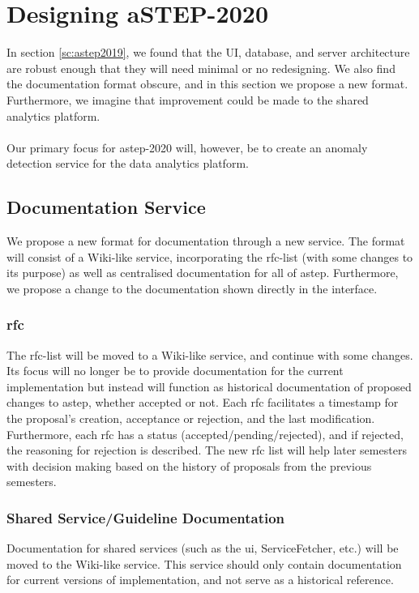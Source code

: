 \section{Designing aSTEP-2020} \label{sc:tsinterface}
In section \ref{sc:astep2019}, we found that the UI, database, and server architecture are robust enough that they will need minimal or no redesigning. We also find the documentation format obscure, and in this section we propose a new format. Furthermore, we imagine that improvement could be made to the shared analytics platform.
\\\\
Our primary focus for \gls{astep}-2020 will, however, be to create an anomaly detection service for the data analytics platform.

\subsection{Documentation Service} \label{sc:docu_proposal}
We propose a new format for documentation through a new service. The format will consist of a Wiki-like service, incorporating the \gls{rfc}-list (with some changes to its purpose) as well as centralised documentation for all of \gls{astep}. Furthermore, we propose a change to the documentation shown directly in the interface.

\subsubsection{\gls{rfc}}
The \gls{rfc}-list will be moved to a Wiki-like service, and continue with some changes. Its focus will no longer be to provide documentation for the current implementation but instead will function as historical documentation of proposed changes to \gls{astep}, whether accepted or not. Each \gls{rfc} facilitates a timestamp for the proposal's creation, acceptance or rejection, and the last modification. Furthermore, each \gls{rfc} has a status (accepted/pending/rejected), and if rejected, the reasoning for rejection is described. The new \gls{rfc} list will help later semesters with decision making based on the history of proposals from the previous semesters.

\subsubsection{Shared Service/Guideline Documentation}
Documentation for shared services (such as the \gls{ui}, ServiceFetcher, etc.) will be moved to the Wiki-like service. This service should only contain documentation for current versions of implementation, and not serve as a historical reference.

